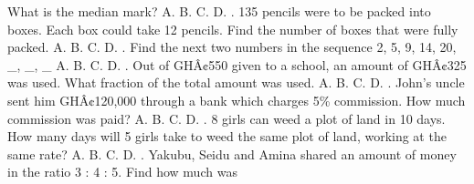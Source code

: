 \documentclass{article}
\begin{document}
\begin{multicols}{2}
What is the median mark? \newline \indent A. \newline \indent B. \newline \indent C. \newline \indent D.  \newline{}. 135 pencils were to be packed into boxes. Each box could take 12 pencils. Find the number of boxes that were fully packed. \newline \indent A. \newline \indent B. \newline \indent C. \newline \indent D.  \newline{}. Find the next two numbers in the sequence 2, 5, 9, 14, 20, \_, \_, \_ \newline \indent A. \newline \indent B. \newline \indent C. \newline \indent D.  \newline{}. Out of GHÂ¢550 given to a school, an amount of GHÂ¢325 was used. What fraction of the total amount was used. \newline \indent A. \newline \indent B. \newline \indent C. \newline \indent D.  \newline{}. John's uncle sent him GHÂ¢120,000 through a bank which charges 5\% commission. How much commission was paid? \newline \indent A. \newline \indent B. \newline \indent C. \newline \indent D.  \newline{}. 8 girls can weed a plot of land in 10 days. How many days will 5 girls take to weed the same plot of land, working at the same rate? \newline \indent A. \newline \indent B. \newline \indent C. \newline \indent D.  \newline{}. Yakubu, Seidu and Amina shared an amount of money in the ratio 3 : 4 : 5. Find how much was 
\end{multicols}
\end{document}
